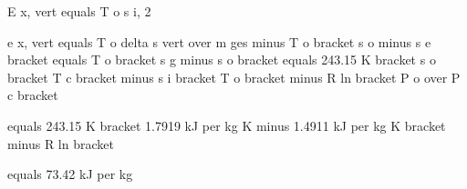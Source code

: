 E x, vert equals T o s i, 2

e x, vert equals T o delta s vert over m ges minus T o bracket s o minus s e bracket equals T o bracket s g minus s o bracket equals 243.15 K bracket s o bracket T c bracket minus s i bracket T o bracket minus R ln bracket P o over P c bracket

equals 243.15 K bracket 1.7919 kJ per kg K minus 1.4911 kJ per kg K bracket minus R ln bracket

equals 73.42 kJ per kg